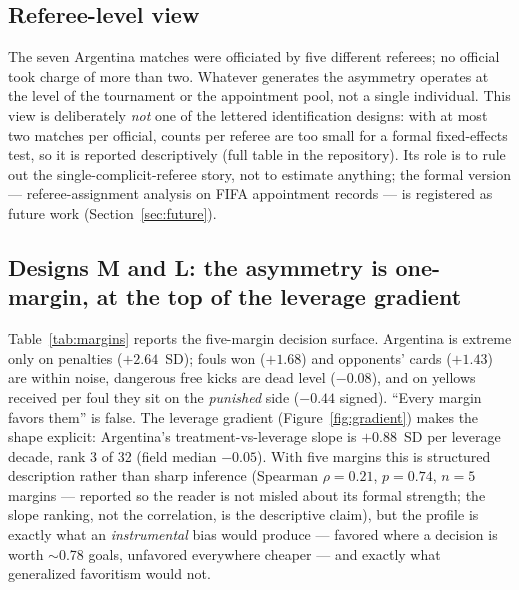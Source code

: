 \documentclass[11pt,a4paper]{article}
\newcommand{\pv}[1]{\ensuremath{p = #1}}
\begin{document}
\subsection{Referee-level view}

The seven Argentina matches were officiated by five different referees; no official
took charge of more than two. Whatever generates the asymmetry operates at the level
of the tournament or the appointment pool, not a single individual. This view is
deliberately \emph{not} one of the lettered identification designs: with at most two
matches per official, counts per referee are too small for a formal fixed-effects
test, so it is reported descriptively (full table in the repository). Its role is to
rule out the single-complicit-referee story, not to estimate anything; the formal
version --- referee-assignment analysis on FIFA appointment records --- is registered
as future work (Section~\ref{sec:future}).

\subsection{Designs M and L: the asymmetry is one-margin, at the top of the leverage
gradient}

Table~\ref{tab:margins} reports the five-margin decision surface. Argentina is
extreme only on penalties ($+2.64$~SD); fouls won ($+1.68$) and opponents' cards
($+1.43$) are within noise, dangerous free kicks are dead level ($-0.08$), and on
yellows received per foul they sit on the \emph{punished} side ($-0.44$ signed).
``Every margin favors them'' is false. The leverage gradient
(Figure~\ref{fig:gradient}) makes the shape explicit: Argentina's treatment-vs-leverage
slope is $+0.88$~SD per leverage decade, rank 3 of 32 (field median $-0.05$). With
five margins this is structured description rather than sharp inference (Spearman
$\rho = 0.21$, \pv{0.74}, $n = 5$ margins --- reported so the reader is not misled
about its formal strength; the slope ranking, not the correlation, is the descriptive
claim), but the
profile is exactly what an \emph{instrumental} bias would produce --- favored where a
decision is worth $\sim$0.78 goals, unfavored everywhere cheaper --- and exactly what
generalized favoritism would not.
\end{document}
